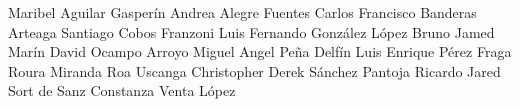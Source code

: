 Maribel Aguilar Gasperín
Andrea Alegre Fuentes
Carlos Francisco Banderas Arteaga
Santiago Cobos Franzoni
Luis Fernando González López
Bruno Jamed Marín
David Ocampo Arroyo
Miguel Angel Peña Delfín
Luis Enrique Pérez Fraga Roura
Miranda Roa Uscanga
Christopher Derek Sánchez Pantoja
Ricardo Jared Sort de Sanz
Constanza Venta López

